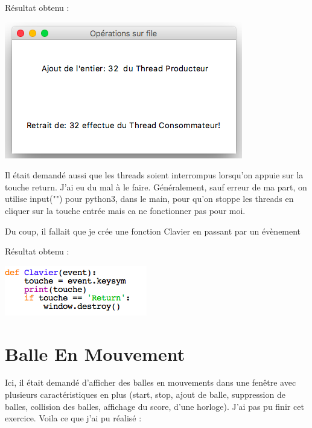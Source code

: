 \documentclass{article}
\begin{document}
Résultat obtenu : 
\begin{center}
  \includegraphics[scale=0.5]{2_3.png}
\end{center}

Il était demandé aussi que les threads soient interrompus lorsqu'on appuie sur la touche return.
J'ai eu du mal à le faire. Généralement, sauf erreur de ma part, on utilise input("") pour python3, dans le main, pour qu'on stoppe les threads en cliquer sur la touche entrée mais ca ne fonctionner pas pour moi.

Du coup, il fallait que je crée une fonction Clavier en passant par un évènement 

Résultat obtenu : 
\begin{center}
  \includegraphics[scale=0.5]{Clavier.png}
\end{center}

 
\section{Balle En Mouvement }

Ici, il était demandé d'afficher des balles en mouvements dans une fenêtre avec plusieurs caractéristiques en plus (start, stop, ajout de balle, suppression de balles, collision des balles, affichage du score, d'une horloge). J'ai pas pu finir cet exercice. Voila ce que j'ai pu réalisé :
\end{document}
